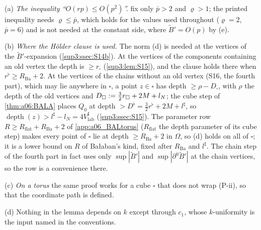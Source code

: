 \begin{remark}\label{sup3:rem:S13}
(a) \emph{The inequality ``$O(rp)\le O(p^2)$''.} \cite[(2.3), (2.7)]{Ba2} fix only $\bar p>2$ and $\varrho>1$; the printed inequality needs $\varrho\le\bar p$, which holds for the values used throughout ($\varrho=2$, $\bar p=6$) and is not needed at the constant side, where $\tilde B'=O(p)$ by (e).

(b) \emph{Where the H\"older clause is used.} The norm (d) is needed at the vertices of the $\tilde B'$-expansion (\cref{sup3:ssec:S14b}). At the vertices of the components containing an old vertex the depth is $\ge r_\square$ (\cref{sup3:lem:S15}), and the clause holds there when $r^\flat\ge R_{\mathrm{Ba}}+2$. At the vertices of the chains without an old vertex (S16, the fourth part), which may lie anywhere in $\square$, a point $z\in\square$ has depth $\ge\rho-D_\square$, with $\rho$ the depth of the old vertices and $D_\square:=\tfrac32r_\square+2M+l_N$; the cube step of \cref{thm:a06:BALA} places $Q_0$ at depth $>D^\flat=\tfrac32r^\flat+2M+l^\sharp$, so $\operatorname{depth}(z)>l^\sharp-l_N=4V^\sharp_{\mathrm{lab}}$ (\cref{sup3:ssec:S15}). The parameter row $R\ge R_{\mathrm{flat}}+R_{\mathrm{Ba}}+2$ of \cref{app:a06_BALtorus} ($R_{\mathrm{flat}}$ the depth parameter of its cube step) makes every point of $\square$ lie at depth $\ge R_{\mathrm{Ba}}+2$ in $\Omega$, so (d) holds on all of $\square$; it is a lower bound on $R$ of Ba{\l}aban's kind, fixed after $R_{\mathrm{Ba}}$ and $l^\sharp$. The chain step of the fourth part in fact uses only $\sup|\tilde B'|$ and $\sup|\partial^\eta\tilde B'|$ at the chain vertices, so the row is a convenience there.

(c) \emph{On a torus} the same proof works for a cube $\square$ that does not wrap (P-ii), so that the coordinate path is defined.

(d) Nothing in the lemma depends on $k$ except through $c_1$, whose $k$-uniformity is the input named in the conventions.
\end{remark}
